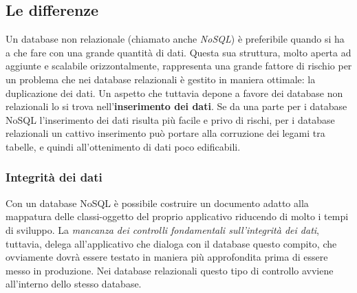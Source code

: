 \subsection{Le differenze}
Un database non relazionale (chiamato anche \textit{NoSQL}) è preferibile quando si ha a che fare con una grande quantità di dati. Questa sua struttura, molto aperta ad aggiunte e scalabile orizzontalmente, rappresenta una grande fattore di rischio per un problema che nei database relazionali è gestito in maniera ottimale: la duplicazione dei dati. Un aspetto che tuttavia depone a favore dei database non relazionali lo si trova nell'\textbf{inserimento dei dati}. Se da una parte per i database NoSQL l'inserimento dei dati risulta più facile e privo di rischi, per i database relazionali un cattivo inserimento può portare alla corruzione dei legami tra tabelle, e quindi all'ottenimento di dati poco edificabili. 

\subsubsection{Integrità dei dati} 
Con un database NoSQL è possibile costruire un documento adatto alla mappatura delle classi-oggetto del proprio applicativo riducendo di molto i tempi di sviluppo. La \textit{mancanza dei controlli fondamentali sull'integrità dei dati}, tuttavia, delega all'applicativo che dialoga con il database questo compito, che ovviamente dovrà essere testato in maniera più approfondita prima di essere messo in produzione. Nei database relazionali questo tipo di controllo avviene all'interno dello stesso database. 

